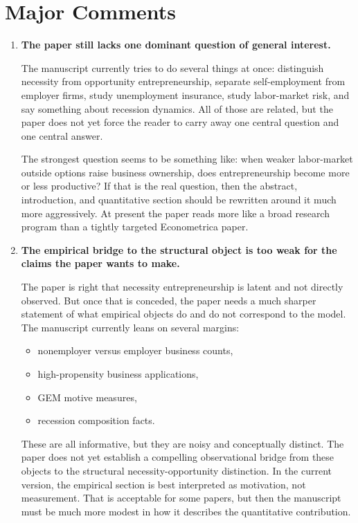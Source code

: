 \documentclass[11pt]{article}
\begin{document}
\section*{Major Comments}

\begin{enumerate}[leftmargin=*,label=\textbf{\arabic*.}]
\item \textbf{The paper still lacks one dominant question of general interest.}

The manuscript currently tries to do several things at once: distinguish
necessity from opportunity entrepreneurship, separate self-employment from
employer firms, study unemployment insurance, study labor-market risk, and say
something about recession dynamics. All of those are related, but the paper does
not yet force the reader to carry away one central question and one central
answer.

The strongest question seems to be something like: when weaker labor-market
outside options raise business ownership, does entrepreneurship become more or
less productive? If that is the real question, then the abstract, introduction,
and quantitative section should be rewritten around it much more aggressively.
At present the paper reads more like a broad research program than a tightly
targeted Econometrica paper.

\item \textbf{The empirical bridge to the structural object is too weak for the
claims the paper wants to make.}

The paper is right that necessity entrepreneurship is latent and not directly
observed. But once that is conceded, the paper needs a much sharper statement of
what empirical objects do and do not correspond to the model. The manuscript
currently leans on several margins:

\begin{itemize}[leftmargin=*]
\item nonemployer versus employer business counts,
\item high-propensity business applications,
\item GEM motive measures,
\item recession composition facts.
\end{itemize}

These are all informative, but they are noisy and conceptually distinct. The
paper does not yet establish a compelling observational bridge from these
objects to the structural necessity-opportunity distinction. In the current
version, the empirical section is best interpreted as motivation, not
measurement. That is acceptable for some papers, but then the manuscript must be
much more modest in how it describes the quantitative contribution.


\end{enumerate}
\end{document}
